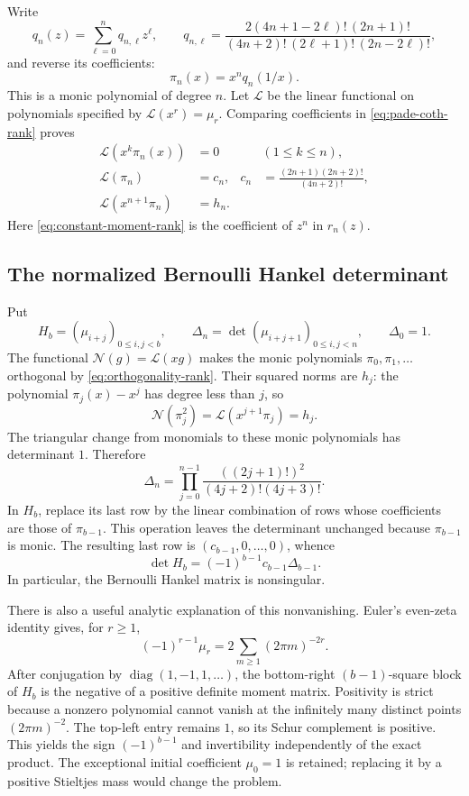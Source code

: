 \documentclass[11pt,a4paper]{article}
\numberwithin{equation}{section}
\theoremstyle{plain}
\theoremstyle{definition}
\theoremstyle{remark}
\begin{document}
Write
\begin{equation}\label{eq:q-explicit-rank}
 q_n(z)=\sum_{\ell=0}^nq_{n,\ell}z^\ell,
 \qquad
 q_{n,\ell}=
 \frac{2(4n+1-2\ell)!\,(2n+1)!}
 {(4n+2)!\,(2\ell+1)!\,(2n-2\ell)!},
\end{equation}
and reverse its coefficients:
\[
 \pi_n(x)=x^nq_n(1/x).
\]
This is a monic polynomial of degree $n$.
Let $\mathcal L$ be the linear functional on polynomials specified by
$\mathcal L(x^r)=\mu_r$.  Comparing coefficients in
\eqref{eq:pade-coth-rank} proves
\begin{align}
 \mathcal L(x^k\pi_n(x))&=0 &&(1\leq k\leq n),
       \label{eq:orthogonality-rank}\\
 \mathcal L(\pi_n)&=c_n,
 &c_n&=\frac{(2n+1)(2n+2)!}{(4n+2)!},
       \label{eq:constant-moment-rank}\\
 \mathcal L(x^{n+1}\pi_n)&=h_n.
       \label{eq:shifted-norm-rank}
\end{align}
Here \eqref{eq:constant-moment-rank} is the coefficient of $z^n$
in $r_n(z)$.

\subsection{The normalized Bernoulli Hankel determinant}

Put
\[
 H_b=(\mu_{i+j})_{0\leq i,j<b},\qquad
 \Delta_n=\det(\mu_{i+j+1})_{0\leq i,j<n},\qquad\Delta_0=1.
\]
The functional $\mathcal N(g)=\mathcal L(xg)$ makes the monic
polynomials $\pi_0,\pi_1,\ldots$ orthogonal by
\eqref{eq:orthogonality-rank}.  Their squared norms are $h_j$:
the polynomial $\pi_j(x)-x^j$ has degree less than $j$, so
\[
 \mathcal N(\pi_j^2)=\mathcal L(x^{j+1}\pi_j)=h_j.
\]
The triangular change from monomials to these monic polynomials has
determinant $1$.  Therefore
\begin{equation}\label{eq:delta-product-rank}
 \Delta_n=\prod_{j=0}^{n-1}
       \frac{((2j+1)!)^2}{(4j+2)!(4j+3)!}.
\end{equation}
In $H_b$, replace its last row by the linear combination of rows
whose coefficients are those of $\pi_{b-1}$.  This operation leaves
the determinant unchanged because $\pi_{b-1}$ is monic.
The resulting last row is $(c_{b-1},0,\ldots,0)$, whence
\begin{equation}\label{eq:H-product-rank}
 \det H_b=(-1)^{b-1}c_{b-1}\Delta_{b-1}.
\end{equation}
In particular, the Bernoulli Hankel matrix is nonsingular.

There is also a useful analytic explanation of this nonvanishing.
Euler's even-zeta identity gives, for $r\geq1$,
\[
 (-1)^{r-1}\mu_r
 =2\sum_{m\geq1}(2\pi m)^{-2r}.
\]
After conjugation by $\operatorname{diag}(1,-1,1,\ldots)$, the
bottom-right $(b-1)$-square block of $H_b$ is the negative of a
positive definite moment matrix.  Positivity is strict because a
nonzero polynomial cannot vanish at the infinitely many distinct
points $(2\pi m)^{-2}$.  The top-left entry remains $1$, so its
Schur complement is positive.  This yields the sign
$(-1)^{b-1}$ and invertibility independently of the exact product.
The exceptional initial coefficient $\mu_0=1$ is retained; replacing
it by a positive Stieltjes mass would change the problem.
\end{document}
